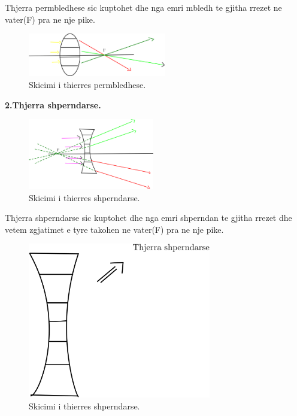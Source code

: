 \documentclass[twocolumn]{article}
\begin{document}
Thjerra permbledhese sic kuptohet dhe nga emri mbledh te gjitha rrezet ne vater(F) pra ne nje pike.\\

\begin{figure}[h]
	\includegraphics[width=60mm]{Imazhet/thierra_permbledhese_F.png}
	\caption{Skicimi i thierres permbledhese.}
	\label{fig:boat1}
\end{figure}



\textbf{2.Thjerra shperndarse.}



\begin{figure}[h]
	\includegraphics[width=55mm]{Imazhet/thjerra_shperndarse_F.png}
	\caption{Skicimi i thierres shperndarse.}
	\label{fig:boat1}
\end{figure}


Thjerra shperndarse sic kuptohet dhe nga emri shperndan te gjitha rrezet dhe vetem zgjatimet e tyre takohen ne vater(F) pra ne nje pike.

\begin{figure}[h]
	\includegraphics[width=80mm]{Imazhet/thjerra_shperndarse.png}
	\caption{Skicimi i thierres shperndarse.}
	\label{fig:boat1}
\end{figure}
\end{document}
